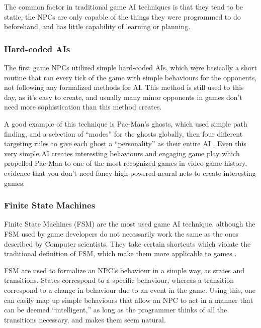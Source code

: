 \documentclass[]{report}
\begin{document}
The common factor in traditional game AI techniques is that they tend to be
static, the NPCs are only capable of the things they were programmed to do
beforehand, and has little capability of learning or planning.


\subsubsection{Hard-coded AIs}
\label{sec:hard-coded-ais}

The first game NPCs utilized simple hard-coded AIs, which were basically a short
routine that ran every tick of the game with simple behaviours for the
opponents, not following any formalized methods for AI. This method is still
used to this day, as it's easy to create, and usually many minor opponents in
games don't need more sophistication than this method creates.

A good example of this technique is Pac-Man's ghosts, which used simple
path finding, and a selection of ``modes'' for the ghosts globally, then four
different targeting rules to give each ghost a ``personality'' as their entire
AI \citep{birch2010pacman,pittmanpac}. Even this very simple AI creates
interesting behaviours and engaging game play which propelled Pac-Man to one of
the most recognized games in video game history, evidence that you don't need
fancy high-powered neural nets to create interesting games.

\subsubsection{Finite State Machines}
\label{sec:finite-state-mach}

Finite State Machines (FSM) are the most used game AI technique, although the
FSM used by game developers do not necessarily work the same as the ones
described by Computer scientists. They take certain shortcuts which violate the
traditional definition of FSM, which make them more applicable to games
\citep{rabin2002implementing}.

FSM are used to formalize an NPC's behaviour in a simple way, as states and
transitions. States correspond to a specific behaviour, whereas a transition
correspond to a change in behaviour due to an event in the game. Using this, one
can easily map up simple behaviours that allow an NPC to act in a manner that
can be deemed ``intelligent,'' as long as the programmer thinks of all the
transitions necessary, and makes them seem natural.
\end{document}
